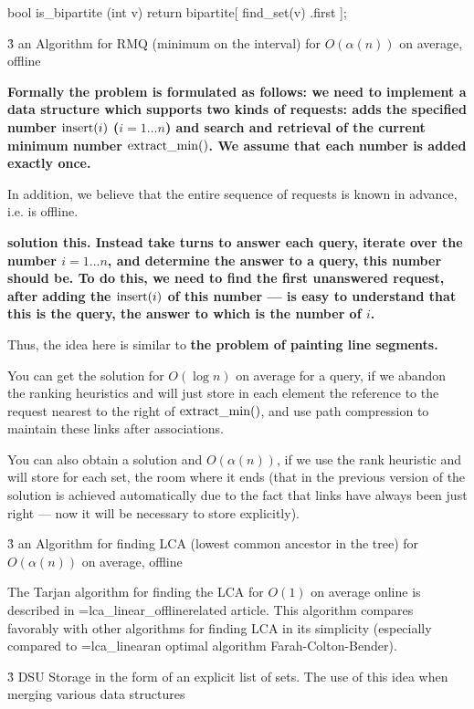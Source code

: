 bool is_bipartite (int v) {
return bipartite[ find_set(v) .first ];
}
\endcode



\h3{ an Algorithm for RMQ (minimum on the interval) for $O(\alpha(n))$ on average, offline }

\bf{Formally} the problem is formulated as follows: we need to implement a data structure which supports two kinds of requests: adds the specified number ${\rm insert}(i)$ ($i = 1 \ldots n$) and search and retrieval of the current minimum number ${\rm extract\_min}()$. We assume that each number is added exactly once.

In addition, we believe that the entire sequence of requests is known in advance, i.e. is offline.

\bf{solution} this. Instead take turns to answer each query, iterate over the number $i = 1 \ldots n$, and determine the answer to a query, this number should be. To do this, we need to find the first unanswered request, after adding the ${\rm insert}(i)$ of this number --- is easy to understand that this is the query, the answer to which is the number of $i$.

Thus, the idea here is similar to \bf{the problem of painting line segments}.

You can get the solution for $O(\log n)$ on average for a query, if we abandon the ranking heuristics and will just store in each element the reference to the request nearest to the right of ${\rm extract\_min}()$, and use path compression to maintain these links after associations.

You can also obtain a solution and $O(\alpha(n))$, if we use the rank heuristic and will store for each set, the room where it ends (that in the previous version of the solution is achieved automatically due to the fact that links have always been just right --- now it will be necessary to store explicitly).



\h3{ an Algorithm for finding LCA (lowest common ancestor in the tree) for $O(\alpha(n))$ on average, offline }

The Tarjan algorithm for finding the LCA for $O(1)$ on average online is described in \algohref=lca_linear_offline{related article}. This algorithm compares favorably with other algorithms for finding LCA in its simplicity (especially compared to \algohref=lca_linear{an optimal algorithm Farah-Colton-Bender}).



\h3{ DSU Storage in the form of an explicit list of sets. The use of this idea when merging various data structures }

